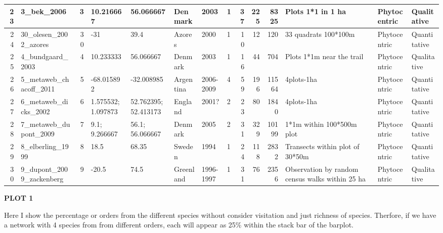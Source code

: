 \documentclass[12pt,]{article}
\begin{document}
\begin{tabular}{r|l|r|l|l|l|l|l|r|r|r|l|l|l}
\hline
23 & 3\_bek\_2006 & 3 & 10.216667 & 56.066667 & Denmark & 2003 & 1 & 37 & 225 & 8325 & Plots 1*1 in 1 ha & Phytocentric & Qualitative\\
\hline
24 & 30\_olesen\_2002\_azores & 30 & -31 & 39.4 & Azores & 2000 & 1 & 10 & 12 & 120 & 33 quadrats 100*100m & Phytocentric & Quantitative\\
\hline
25 & 4\_bundgaard\_2003 & 4 & 10.233333 & 56.066667 & Denmark & 2003 & 1 & 16 & 44 & 704 & Plots 1*1m near the trail & Phytocentric & Qualitative\\
\hline
26 & 5\_metaweb\_chacoff\_2011 & 5 & -68.015892 & -32.008985 & Argentina & 2006-2009 & 4 & 59 & 196 & 11564 & 4plots-1ha & Phytocentric & Quantitative\\
\hline
27 & 6\_metaweb\_dicks\_2002 & 6 & 1.575532; 1.097873 & 52.762395; 52.413173 & England & 2001? & 2 & 23 & 80 & 1840 & 4plots-1ha & Phytocentric & Quantitative\\
\hline
28 & 7\_metaweb\_dupont\_2009 & 7 & 9.1; 9.266667 & 56.1; 56.066667 & Denmark & 2005 & 2 & 31 & 329 & 10199 & 1*1m within 100*500m plot & Phytocentric & Quantitative\\
\hline
29 & 8\_elberling\_1999 & 8 & 18.5 & 68.35 & Sweden & 1994 & 1 & 24 & 118 & 2832 & Transects within plot of 30*50m & Phytocentric & Quantitative\\
\hline
30 & 9\_dupont\_2009\_zackenberg & 9 & -20.5 & 74.5 & Greenland & 1996-1997 & 1 & 31 & 76 & 2356 & Observation by random census walks within 25 ha & Phytocentric & Qualitative\\
\hline
\end{tabular}

\elandscape

\newpage

\textbf{PLOT 1}

Here I show the percentage or orders from the different species without
consider visitation and just richness of species. Therfore, if we have a
network with 4 species from from different orders, each will appear as
25\% within the stack bar of the barplot.

\vspace{4cm}
\end{document}
